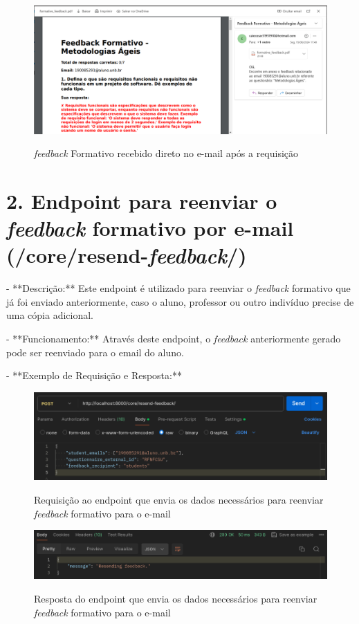 \begin{figure}[H]
    \centering
    \caption{\textit{feedback} Formativo recebido direto no e-mail após a requisição}
    \includegraphics[width=1\textwidth]{figuras/feedback.png}
    \label{fig:report_questions}
\end{figure}

\section*{2. Endpoint para reenviar o \textit{feedback} formativo por e-mail (/core/resend-\textit{feedback}/)}

- **Descrição:** Este endpoint é utilizado para reenviar o \textit{feedback} formativo que já foi enviado anteriormente, caso o aluno, professor ou outro indivíduo precise de uma cópia adicional.

- **Funcionamento:** Através deste endpoint, o \textit{feedback} anteriormente gerado pode ser reenviado para o email do aluno.

- **Exemplo de Requisição e Resposta:**

\begin{figure}[H]
    \centering
    \caption{Requisição ao endpoint que envia os dados necessários para reenviar \textit{feedback} formativo para o e-mail}
    \includegraphics[width=1\textwidth]{figuras/resend_report.png}
    \label{fig:report_questions}
\end{figure}

\begin{figure}[H]
    \centering
    \caption{Resposta do endpoint que envia os dados necessários para reenviar \textit{feedback} formativo para o e-mail}
    \includegraphics[width=1\textwidth]{figuras/resend_report_result.png}
    \label{fig:report_questions}
\end{figure}

